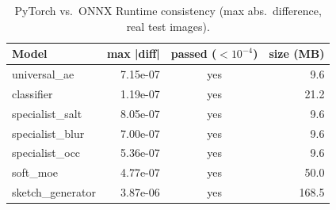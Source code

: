 \begin{table}[t]
\centering
\caption{PyTorch vs.\ ONNX Runtime consistency (max abs.\ difference, real test images).}
\label{tab:onnx}
\footnotesize
\begin{tabular}{lrcr}
\toprule
Model & max |diff| & passed ($<10^{-4}$) & size (MB) \\
\midrule
universal\_ae & 7.15e-07 & yes & 9.6 \\
classifier & 1.19e-07 & yes & 21.2 \\
specialist\_salt & 8.05e-07 & yes & 9.6 \\
specialist\_blur & 7.00e-07 & yes & 9.6 \\
specialist\_occ & 5.36e-07 & yes & 9.6 \\
soft\_moe & 4.77e-07 & yes & 50.0 \\
sketch\_generator & 3.87e-06 & yes & 168.5 \\
\bottomrule
\end{tabular}
\end{table}
